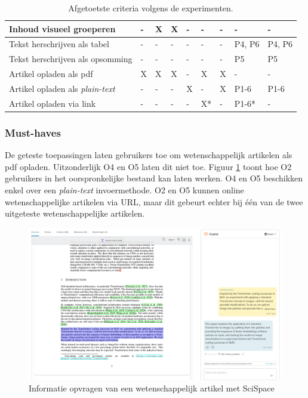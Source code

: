 \begin{table}[H]
\begin{tabular}{ | m{8cm} | m{0.5cm} | m{0.5cm} | m{0.5cm} | m{0.5cm} | m{0.5cm} | m{0.5cm} | m{1cm} | m{1cm} | }
		Inhoud visueel groeperen & - & X & X & - & - & - & - & - \\ \hline
		Tekst herschrijven als tabel & - & - & - & - & - & - & P4, P6 & P4, P6 \\ \hline
		Tekst herschrijven als opsomming & - & - & - & - & - & - & P5 & P5 \\ \hline
		Artikel opladen als pdf & X & X & X & - & X & X & - & - \\ \hline
		Artikel opladen als \textit{plain-text} & - & - & - & X & - & X & P1-6 & P1-6 \\ \hline
		Artikel opladen via link & - & - & - & - & X* & - & P1-6* & - \\ \hline
	\end{tabular}
	\caption{Afgetoetste criteria volgens de experimenten.}
	\label{table:afgetoetste-criteria}
\end{table}

\subsubsection{Must-haves}

De geteste toepassingen laten gebruikers toe om wetenschappelijk artikelen als pdf opladen. Uitzonderlijk O4 en O5 laten dit niet toe. Figuur \ref{img:scispace-example} toont hoe O2 gebruikers in het oorspronkelijke bestand kan laten werken. O4 en O5 beschikken enkel over een \textit{plain-text} invoermethode. O2 en O5 kunnen online wetenschappelijke artikelen via URL, maar dit gebeurt echter bij één van de twee uitgeteste wetenschappelijke artikelen.

\begin{figure}[H]
	\includegraphics{img/typeset-example.png}
	\caption{Informatie opvragen van een wetenschappelijk artikel met SciSpace}
	\label{img:scispace-example}
\end{figure}


